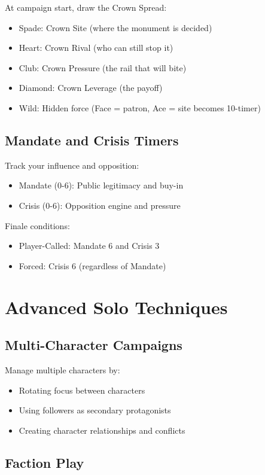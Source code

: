 \documentclass[11pt]{article}
\begin{document}
At campaign start, draw the Crown Spread:
\begin{itemize}
    \item Spade: Crown Site (where the monument is decided)
    \item Heart: Crown Rival (who can still stop it)
    \item Club: Crown Pressure (the rail that will bite)
    \item Diamond: Crown Leverage (the payoff)
    \item Wild: Hidden force (Face = patron, Ace = site becomes 10-timer)
\end{itemize}

\subsection{Mandate and Crisis Timers}

Track your influence and opposition:
\begin{itemize}
    \item Mandate (0-6): Public legitimacy and buy-in
    \item Crisis (0-6): Opposition engine and pressure
\end{itemize}

Finale conditions:
\begin{itemize}
    \item Player-Called: Mandate 6 and Crisis 3
    \item Forced: Crisis 6 (regardless of Mandate)
\end{itemize}

\section{Advanced Solo Techniques}

\subsection{Multi-Character Campaigns}

Manage multiple characters by:
\begin{itemize}
    \item Rotating focus between characters
    \item Using followers as secondary protagonists
    \item Creating character relationships and conflicts
\end{itemize}

\subsection{Faction Play}
\end{document}
